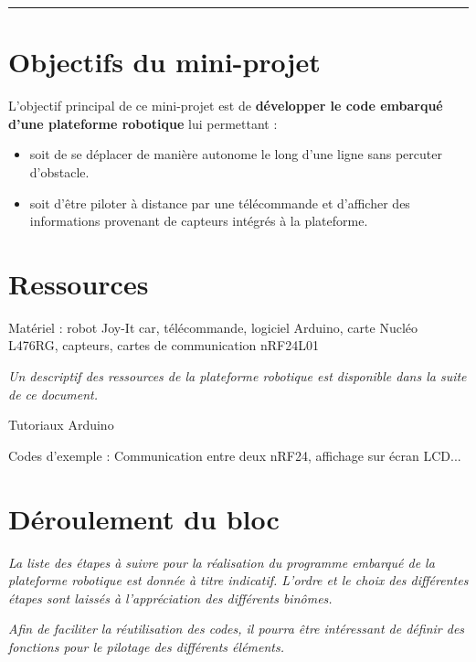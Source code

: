 \documentclass[a4paper,11pt,titlepage]{article} %
\begin{document}
\noindent \rule{\linewidth}{1pt}



\section{Objectifs du mini-projet}

L'objectif principal de ce mini-projet est de \textbf{développer le code embarqué d'une plateforme robotique} lui permettant : 

\begin{itemize}
	\item soit de se déplacer de manière autonome le long d'une ligne sans percuter d'obstacle.
	\item soit d'être piloter à distance par une télécommande et d'afficher des informations provenant de capteurs intégrés à la plateforme.
\end{itemize}


\section{Ressources}

Matériel : robot Joy-It car, télécommande, logiciel Arduino, carte Nucléo L476RG, capteurs, cartes de communication nRF24L01

\textit{Un descriptif des ressources de la plateforme robotique est disponible dans la suite de ce document.}

Tutoriaux Arduino

Codes d'exemple : Communication entre deux nRF24, affichage sur écran LCD...




\section{Déroulement du bloc}

\textit{La liste des étapes à suivre pour la réalisation du programme embarqué de la plateforme robotique est donnée à titre indicatif. L'ordre et le choix des différentes étapes sont laissés à l'appréciation des différents binômes.}

\textit{Afin de faciliter la réutilisation des codes, il pourra être intéressant de définir des fonctions pour le pilotage des différents éléments.}
\end{document}
